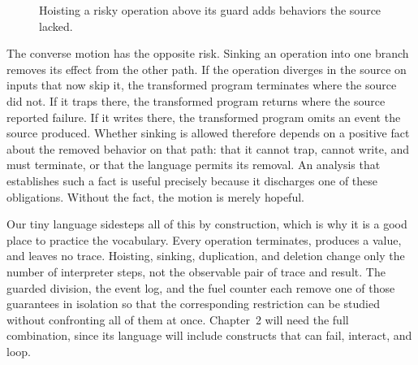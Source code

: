 \begin{figure}
  \centering
  \caption{Hoisting a risky operation above its guard adds behaviors the source lacked.}
  \label{fig:trap-hoist}
\end{figure}

The converse motion has the opposite risk.
Sinking an operation into one branch removes its effect from the other path.
If the operation diverges in the source on inputs that now skip it, the transformed program terminates where the source did not.
If it traps there, the transformed program returns where the source reported failure.
If it writes there, the transformed program omits an event the source produced.
Whether sinking is allowed therefore depends on a positive fact about the removed behavior on that path: that it cannot trap, cannot write, and must terminate, or that the language permits its removal.
An analysis that establishes such a fact is useful precisely because it discharges one of these obligations.
Without the fact, the motion is merely hopeful.

Our tiny language sidesteps all of this by construction, which is why it is a good place to practice the vocabulary.
Every operation terminates, produces a value, and leaves no trace.
Hoisting, sinking, duplication, and deletion change only the number of interpreter steps, not the observable pair of trace and result.
The guarded division, the event log, and the fuel counter each remove one of those guarantees in isolation so that the corresponding restriction can be studied without confronting all of them at once.
Chapter~2 will need the full combination, since its language will include constructs that can fail, interact, and loop.

